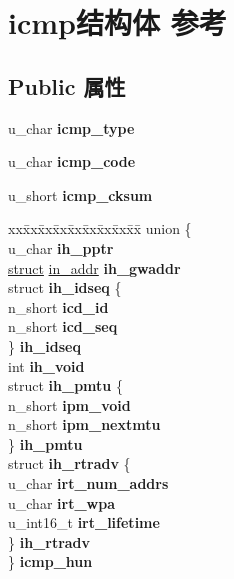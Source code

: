 \hypertarget{structicmp}{}\section{icmp结构体 参考}
\label{structicmp}
\subsection*{Public 属性}
\begin{DoxyCompactItemize}
\item 
\mbox{\label{structicmp_aa1e03d610e2391565d96ef5ace20caf6}} 
u\+\_\+char {\bfseries icmp\+\_\+type}
\item 
\mbox{\label{structicmp_a4db7a65d2113b9800928821b67494ee0}} 
u\+\_\+char {\bfseries icmp\+\_\+code}
\item 
\mbox{\label{structicmp_af1087f74d787650ed3b46ea777de030f}} 
u\+\_\+short {\bfseries icmp\+\_\+cksum}
\item 
\mbox{\label{structicmp_a0495c8f0af332ef2ec4e8972272d0f93}} 
\begin{tabbing}
xx\=xx\=xx\=xx\=xx\=xx\=xx\=xx\=xx\=\kill
union \{\\
\>u\_char {\bfseries ih\_pptr}\\
\>\hyperlink{interfacestruct}{struct} \hyperlink{structin__addr}{in\_addr} {\bfseries ih\_gwaddr}\\
\>struct {\bfseries ih\_idseq} \{\\
\>\>n\_short {\bfseries icd\_id}\\
\>\>n\_short {\bfseries icd\_seq}\\
\>\} {\bfseries ih\_idseq}\\
\>int {\bfseries ih\_void}\\
\>struct {\bfseries ih\_pmtu} \{\\
\>\>n\_short {\bfseries ipm\_void}\\
\>\>n\_short {\bfseries ipm\_nextmtu}\\
\>\} {\bfseries ih\_pmtu}\\
\>struct {\bfseries ih\_rtradv} \{\\
\>\>u\_char {\bfseries irt\_num\_addrs}\\
\>\>u\_char {\bfseries irt\_wpa}\\
\>\>u\_int16\_t {\bfseries irt\_lifetime}\\
\>\} {\bfseries ih\_rtradv}\\
\} {\bfseries icmp\_hun}\\


\end{tabbing}
\end{DoxyCompactItemize}
